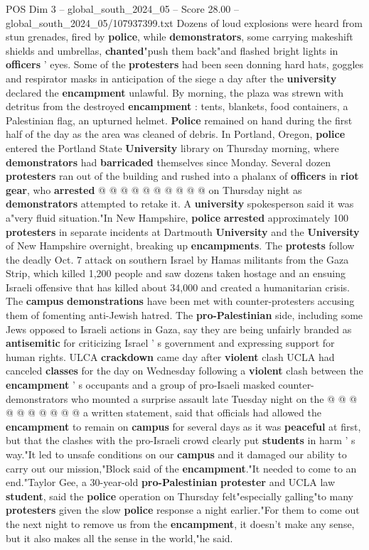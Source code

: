 \begin{textsample}{POS Dim 3 – global\_south\_2024\_05 – Score 28.00 – global\_south\_2024\_05/107937399.txt}
Dozens of loud explosions were heard from stun grenades, fired by \textbf{police}, while \textbf{demonstrators}, some carrying makeshift shields and umbrellas, \textbf{chanted}"push them back"and flashed bright lights in \textbf{officers} ' eyes.
Some of the \textbf{protesters} had been seen donning hard hats, goggles and respirator masks in anticipation of the siege a day after the \textbf{university} declared the \textbf{encampment} unlawful.
By morning, the plaza was strewn with detritus from the destroyed \textbf{encampment} : tents, blankets, food containers, a Palestinian flag, an upturned helmet. \textbf{Police} remained on hand during the first half of the day as the area was cleaned of debris.
In Portland, Oregon, \textbf{police} entered the Portland State \textbf{University} library on Thursday morning, where \textbf{demonstrators} had \textbf{barricaded} themselves since Monday.
Several dozen \textbf{protesters} ran out of the building and rushed into a phalanx of \textbf{officers} in \textbf{riot} \textbf{gear}, who \textbf{arrested} @ @ @ @ @ @ @ @ @ @ on Thursday night as \textbf{demonstrators} attempted to retake it.
A \textbf{university} spokesperson said it was a"very fluid situation."In New Hampshire, \textbf{police} \textbf{arrested} approximately 100 \textbf{protesters} in separate incidents at Dartmouth \textbf{University} and the \textbf{University} of New Hampshire overnight, breaking up \textbf{encampments}.
The \textbf{protests} follow the deadly Oct. 7 attack on southern Israel by Hamas militants from the Gaza Strip, which killed 1,200 people and saw dozens taken hostage and an ensuing Israeli offensive that has killed about 34,000 and created a humanitarian crisis.
The \textbf{campus} \textbf{demonstrations} have been met with counter-protesters accusing them of fomenting anti-Jewish hatred.
The \textbf{pro-Palestinian} side, including some Jews opposed to Israeli actions in Gaza, say they are being unfairly branded as \textbf{antisemitic} for criticizing Israel ' s government and expressing support for human rights.
ULCA \textbf{crackdown} came day after \textbf{violent} clash UCLA had canceled \textbf{classes} for the day on Wednesday following a \textbf{violent} clash between the \textbf{encampment} ' s occupants and a group of pro-Isaeli masked counter-demonstrators who mounted a surprise assault late Tuesday night on the @ @ @ @ @ @ @ @ @ @ a written statement, said that officials had allowed the \textbf{encampment} to remain on \textbf{campus} for several days as it was \textbf{peaceful} at first, but that the clashes with the pro-Israeli crowd clearly put \textbf{students} in harm ' s way."It led to unsafe conditions on our \textbf{campus} and it damaged our ability to carry out our mission,"Block said of the \textbf{encampment}."It needed to come to an end."Taylor Gee, a 30-year-old \textbf{pro-Palestinian} \textbf{protester} and UCLA law \textbf{student}, said the \textbf{police} operation on Thursday felt"especially galling"to many \textbf{protesters} given the slow \textbf{police} response a night earlier."For them to come out the next night to remove us from the \textbf{encampment}, it doesn't make any sense, but it also makes all the sense in the world,"he said.

\end{textsample}
